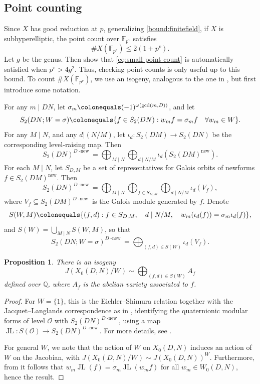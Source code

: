 \documentclass[12pt]{amsart}
\newcommand{\F}{\mathbb{F}}
\newcommand{\Q}{\mathbb{Q}}
\newcommand{\calO}{\mathcal{O}}
\DeclareMathOperator{\JL}{JL}
\DeclareMathOperator{\new}{new}
\newcommand{\Dnew}{D\operatorname{-new}}
\numberwithin{equation}{subsection}
\theoremstyle{plain}\newtheorem{ithm}{Theorem}
\theoremstyle{plain}\newtheorem{iprop}[ithm]{Proposition}
\newtheorem{proposition}[equation]{Proposition}
\theoremstyle{definition}
\theoremstyle{remark}
\newcommand{\Order}{\calO} %
\newcommand{\Curve}[2]{X_0({#1},{#2})} %
\newcommand{\ALfull}[2]{W_0({#1},{#2})} %
\begin{document}
\subsection{Point counting}
Since $X$ has good reduction at $p$, generalizing \eqref{bound:finitefield}, if $X$ is subhyperelliptic, the point count over $\F_{p^v}$ satisfies 
\begin{equation}
\label{eq:small point count}
\#X(\F_{p^v}) \leq 2 (1+p^v).
\end{equation}
Let $g$ be the genus.
Then \cite[p.182]{HH96} show that \eqref{eq:small point count} is automatically satisfied when $p^v>4g^2$. Thus, checking point counts is only useful up to this bound.
To count $\#X(\F_{p^v})$, we use an isogeny, analogous to the one in \cite{Ribet}, but first introduce some notation.

For any $m \mid DN$, let $\sigma_m \colonequals (-1)^{\omega(\gcd(m,D))}$, and let
$$
S_2(DN; W = \sigma) \colonequals \{ f \in S_2(DN) : w_m f = \sigma_m f \quad \forall w_m \in W \}.
$$
For any $M \mid N$, and any $d | (N/M)$, let $\iota_d : S_2(DM) \to S_2(DN)$ be the corresponding level-raising map. 
Then 
$$
S_2(DN)^{\Dnew} = \bigoplus_{M \mid N} \bigoplus_{d \mid N/M} \iota_d(S_2(DM)^{\new}).
$$
For each $M \mid N$, let $S_{D,M}$ be a set of representatives for Galois orbits of newforms $f \in S_2(DM)^{\new}$. Then 
$$
S_2(DN)^{\Dnew} =  \bigoplus_{M \mid N} \bigoplus_{f \in S_{D,M}} \bigoplus_{d \mid N/M} \iota_d(V_f),
$$
where $V_f \subseteq S_2(DM)^{\Dnew}$ is the Galois module generated by $f$. 
Denote 
$$
S(W, M) \colonequals \{ (f,d) : f \in S_{D,M}, \quad d \mid N/M, \quad w_m (\iota_d(f)) = \sigma_m \iota_d(f) \},
$$
and $S(W) = \bigcup_{M \mid N} S(W,M)$, so that 
$$
S_2(DN; W = \sigma)^{\Dnew} = \bigoplus_{(f,d) \in S(W)} \iota_d(V_f).
$$
\begin{proposition} \label{prop:decomposition}
There is an isogeny
$$
J(\Curve{D}{N} / W) \sim \bigoplus_{(f,d) \in S(W)} A_f 
$$
defined over $\Q$, where $A_f$ is the abelian variety associated to $f$. 
\end{proposition}


\begin{proof}
    For $W = \{1 \}$, this is the Eichler--Shimura relation together with the Jacquet--Langlands correspondence as in \cite[Theorem 2.12]{Hida}, identifying the quaternionic modular forms of level $\Order$ with $S_2(DN)^{\Dnew}$, using a map $\JL : S(\Order) \to S_2(DN)^{\Dnew}$. For more details, see \cite[Proposition 1.18(iii)]{Nekovar}.

    For general $W$, we note that the action of $W$ on $\Curve{D}{N}$ induces an action of $W$ on the Jacobian, with $J(\Curve{D}{N}/W) \sim J(\Curve{D}{N})^W$. Furthermore, from \cite[Theorem 8.1]{GelbartJacquet} it follows that $w_m \JL(f) = \sigma_m \JL(w_m f)$ for all $w_m \in \ALfull{D}{N}$, hence the result.
\end{proof}
\end{document}
